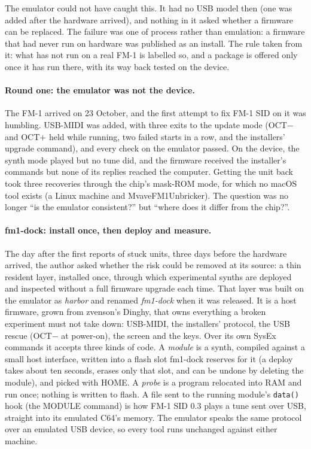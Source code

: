 \documentclass[10pt,a4paper]{article}
\newcommand{\code}[1]{\texttt{#1}}
\begin{document}
The emulator could not have caught this. It had no USB model then (one was added after the hardware
arrived), and nothing in it asked whether a firmware can be replaced. The
failure was one of process rather than emulation: a firmware that had never run on hardware was
published as an install. The rule taken from it: what has not run on a real FM-1 is labelled so, and
a package is offered only once it has run there, with its way back tested on the device.

\paragraph{Round one: the emulator was not the device.} The FM-1 arrived on 23 October, and the
first attempt to fix FM-1 SID on it was humbling. USB-MIDI was added, with three exits to the update
mode (OCT$-$ and OCT$+$ held while running, two failed starts in a row, and the installers' upgrade
command), and every check on the emulator passed. On the device, the synth mode played but no tune
did, and the firmware received the installer's commands but none of its replies reached the
computer. Getting the unit back took three recoveries through the chip's mask-ROM mode, for which no
macOS tool exists (a Linux machine and MvaveFM1Unbricker). The question was no longer ``is the
emulator consistent?'' but ``where does it differ from the chip?''.

\paragraph{fm1-dock: install once, then deploy and measure.} The day after the first reports of stuck
units, three days before the hardware arrived, the author asked whether the risk could be removed at its
source: a thin resident layer, installed once, through which experimental synths are deployed and
inspected without a full firmware upgrade each time. That layer was built on the emulator as
\emph{harbor} and renamed \emph{fm1-dock} when it was released. It is a host firmware, grown from
zvenson's Dinghy, that owns everything a broken experiment must not take down: USB-MIDI, the
installers' protocol, the USB rescue (OCT$-$ at power-on), the screen and the keys. Over its own
SysEx commands it accepts three kinds of code. A \emph{module} is a synth, compiled against a small
host interface, written into a flash slot fm1-dock reserves for it (a deploy takes about ten
seconds, erases only that slot, and can be undone by deleting the module), and picked with HOME.
A \emph{probe} is a program relocated into RAM and run once; nothing is written to flash. A file sent
to the running module's \code{data()} hook (the MODULE command) is how FM-1 SID 0.3 plays a tune sent
over USB, straight into its emulated C64's memory. The emulator speaks the same protocol over an
emulated USB device, so every tool runs unchanged against either machine.
\end{document}
